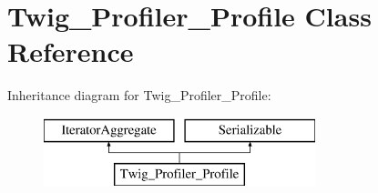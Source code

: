 \hypertarget{class_twig___profiler___profile}{}\section{Twig\+\_\+\+Profiler\+\_\+\+Profile Class Reference}
\label{class_twig___profiler___profile}
Inheritance diagram for Twig\+\_\+\+Profiler\+\_\+\+Profile\+:\begin{figure}[H]
\begin{center}
\leavevmode
\includegraphics[height=2.000000cm]{class_twig___profiler___profile}
\end{center}
\end{figure}
